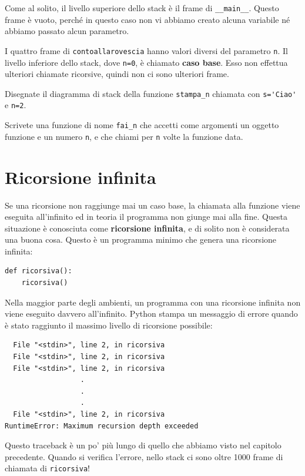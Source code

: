 \documentclass[10pt]{book}
\begin{document}
Come al solito, il livello superiore dello stack è il frame di \verb"__main__".
Questo frame è vuoto, perché in questo caso non vi abbiamo creato alcuna variabile né abbiamo passato alcun parametro.

I quattro frame di {\tt contoallarovescia} hanno valori diversi del parametro {\tt n}. Il livello inferiore dello stack, dove {\tt n=0}, è chiamato {\bf caso base}. Esso non effettua ulteriori chiamate ricorsive, quindi non ci sono ulteriori frame.

\vspace{0.2in}

\begin{exercise}
Disegnate il diagramma di stack della funzione \verb"stampa_n" chiamata con
\verb"s='Ciao'" e {\tt n=2}.
\end{exercise}

\vspace{0.2in}

\begin{exercise}
Scrivete una funzione di nome \verb"fai_n" che accetti come argomenti un oggetto funzione e un numero {\tt n}, e che chiami per {\tt n} volte la funzione data.
\end{exercise}



\section{Ricorsione infinita}

Se una ricorsione non raggiunge mai un caso base, la chiamata alla funzione viene eseguita all'infinito ed in teoria il programma non giunge mai alla fine. Questa situazione è conosciuta come {\bf ricorsione infinita}, e di solito non è considerata una buona cosa.
Questo è un programma minimo che genera una ricorsione infinita:

\begin{verbatim}
def ricorsiva():
    ricorsiva()
\end{verbatim}
%
Nella maggior parte degli ambienti, un programma con una ricorsione infinita non viene eseguito davvero all'infinito. Python stampa un messaggio di errore quando è stato raggiunto il massimo livello di ricorsione possibile:

\begin{verbatim}
  File "<stdin>", line 2, in ricorsiva
  File "<stdin>", line 2, in ricorsiva
  File "<stdin>", line 2, in ricorsiva
                  .   
                  .
                  .
  File "<stdin>", line 2, in ricorsiva
RuntimeError: Maximum recursion depth exceeded
\end{verbatim}
%
Questo traceback è un po' più lungo di quello che abbiamo visto nel capitolo precedente. Quando si verifica l'errore, nello stack ci sono oltre 1000 frame di chiamata di {\tt ricorsiva}!
\end{document}
